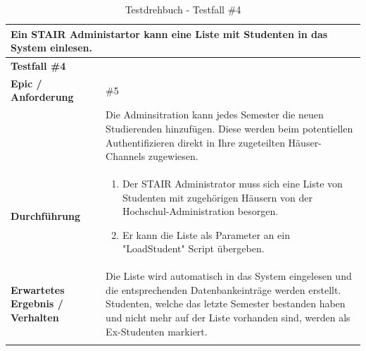 \documentclass[a4paper, table]{article}
\begin{document}
\begin{longtable}[h]{|p{15em}|p{25em}|}
    \hline
    \multicolumn{2}{|l|}{\textbf{Ein STAIR Administartor kann eine Liste mit Studenten in das System einlesen.}} \\
    \hline
    \multicolumn{2}{|l|}{\textbf{Testfall \#4}} \\
    \hline
    \textbf{Epic / Anforderung} & \#5 \\*
     & Die Adminsitration kann jedes Semester die neuen Studierenden hinzufügen.
     Diese werden beim potentiellen Authentifizieren direkt in Ihre zugeteilten Häuser-Channels zugewiesen. \\
    \hline
    \textbf{Durchführung} &
    \begin{enumerate}
        \item Der STAIR Administrator muss sich eine Liste von Studenten mit zugehörigen Häusern von der Hochschul-Administration besorgen.
        \item Er kann die Liste als Parameter an ein "LoadStudent" Script übergeben.
    \end{enumerate}\\
    \hline
    \textbf{Erwartetes Ergebnis / Verhalten} & Die Liste wird automatisch in das System eingelesen und die entsprechenden Datenbankeinträge werden erstellt.
    Studenten, welche das letzte Semester bestanden haben und nicht mehr auf der Liste vorhanden sind, werden als Ex-Studenten markiert.\\
    \hline
    \caption{Testdrehbuch - Testfall \#4}
\end{longtable}
\end{document}
